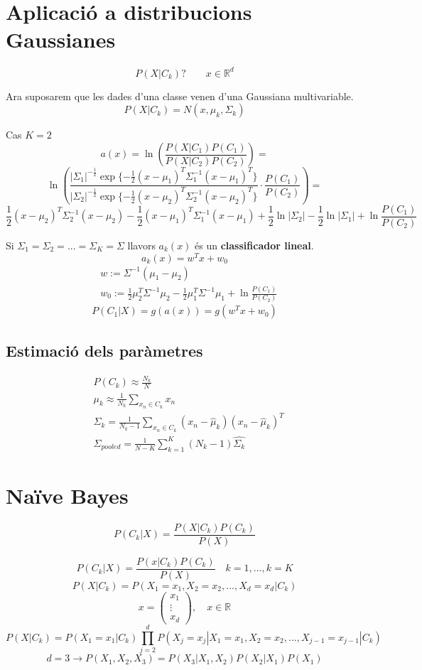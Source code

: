 \documentclass[a4paper]{article}
\begin{document}
\section{Aplicació a distribucions Gaussianes}
$$
P(X|C_k) ? \qquad x \in \mathbb{R}^d
$$

Ara suposarem que les dades d'una classe venen d'una Gaussiana multivariable.
$$
P(X|C_k) = N(x, \mu_k, \Sigma_k)
$$

Cas $K=2$
$$
a(x) = \ln \left( \frac{P(X|C_1)P(C_1)}{P(X|C_2)P(C_2)} \right) =
$$
$$
\ln \left( \frac{|\Sigma_1|^{-\frac{1}{2}} 
	\exp\{ -\frac{1}{2}(x - \mu_1)^T \Sigma_1^{-1}(x - \mu_1)^T \} }
	{|\Sigma_2|^{-\frac{1}{2}} 
	\exp\{ -\frac{1}{2}(x - \mu_2)^T \Sigma_2^{-1}(x - \mu_2)^T \}} ·
\frac{P(C_1)}{P(C_2)}\right) =
$$
$$
\frac{1}{2}(x - \mu_2)^T \Sigma_2^{-1} (x - \mu_2) - \frac{1}{2}(x - \mu_1)^T 
\Sigma_1^{-1}(x - \mu_1) + \frac{1}{2}\ln|\Sigma_2| - \frac{1}{2}\ln|\Sigma_1| + 
\ln \frac{P(C_1)}{P(C_2)}
$$

Si $\Sigma_1 = \Sigma_2 = ... = \Sigma_K = \Sigma$ llavors $a_k(x)$ és un \textbf{classificador lineal}.
$$
a_k(x) = w^T x + w_0
$$
\begin{align*}
	& w := \Sigma^{-1}(\mu_1 - \mu_2) \\
	& w_0 := \frac{1}{2} \mu_2^T \Sigma^{-1}\mu_2 - \frac{1}{2}\mu_1^T \Sigma^{-1}\mu_1
	+ \ln \frac{P(C_1)}{P(C_2)}
\end{align*}
$$
P(C_1|X) = g(a(x)) = g(w^Tx + w_0)
$$

\subsection{Estimació dels paràmetres}

\begin{align*}
&	P(C_k) \approx \frac{N_k}{N} \\
&	\mu_k \approx \frac{1}{N_k} \sum_{x_n \in C_k} x_n \\
&	\Sigma_k = \frac{1}{N_k - 1} \sum_{x_n \in C_k} (x_n - \hat{\mu}_k)(x_n - \hat{\mu}_k)^T \\
&	\Sigma_{pooled} = \frac{1}{N - K} \sum_{k=1}^K (N_k - 1) \hat{\Sigma_k}
\end{align*}

\section{Naïve Bayes}
$$
P(C_k|X) = \frac{P(X|C_k)P(C_k)}{P(X)}
$$


$$
P(C_k|X) = \frac{P(x|C_k)P(C_k)}{P(X)} \quad k=1,...,k=K
$$
$$
P(X|C_k) = P(X_1=x_1, X_2=x_2, ..., X_d = x_d|C_k)
$$
$$
x = 
\begin{pmatrix}
x_1 \\ \vdots \\ x_d
\end{pmatrix}, \quad
x \in \mathbb{R}
$$
$$
P(X|C_k) = P(X_1=x_1|C_k)\prod_{j=2}^d P(X_j=x_j|X_1=x_1,X_2=x_2,...,X_{j-1}=x_{j-1}|C_k)
$$
$$
d=3 \rightarrow P(X_1,X_2,X_3) = P(X_3|X_1,X_2)P(X_2|X_1)P(X_1)
$$
\end{document}
